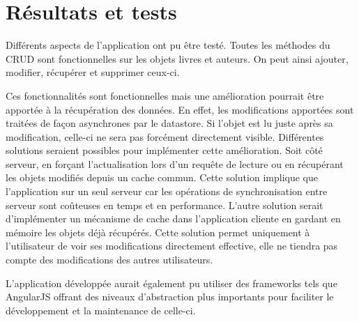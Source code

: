 \chapter{Résultats et tests}

Différents aspects de l'application ont pu être testé. Toutes les méthodes du CRUD sont fonctionnelles sur les objets livres et auteurs. On peut ainsi ajouter, modifier, récupérer et supprimer ceux-ci.

Ces fonctionnalités sont fonctionnelles mais une amélioration pourrait être apportée à la récupération des données. En effet, les modifications apportées sont traitées de façon asynchrones par le datastore. Si l'objet est lu juste après sa modification, celle-ci ne sera pas forcément directement visible. Différentes solutions seraient possibles pour implémenter cette amélioration. Soit côté serveur, en forçant l'actualisation lors d'un requête de lecture ou en récupérant les objets modifiés depuis un cache commun. Cette solution implique que l'application sur un seul serveur car les opérations de synchronisation entre serveur sont coûteuses en temps et en performance. L'autre solution serait d'implémenter un mécanisme de cache dans l'application cliente en gardant en mémoire les objets déjà récupérés. Cette solution permet uniquement à l'utilisateur de voir ses modifications directement effective, elle ne tiendra pas compte des modifications des autres utilisateurs.

L'application développée aurait également pu utiliser des frameworks tels que AngularJS offrant des niveaux d'abstraction plus importants pour faciliter le développement et la maintenance de celle-ci. 